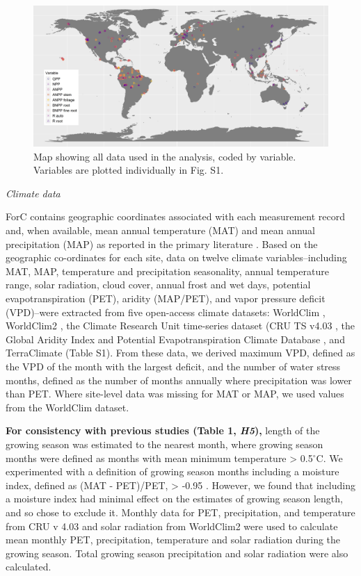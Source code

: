 \documentclass[
]{article}
\begin{document}
\begin{figure}[H]
\includegraphics[width=1\linewidth]{distribution_all_variables_cropped} \caption{Map showing all data used in the analysis, coded by variable. Variables are plotted individually in Fig. S1. }\label{fig:unnamed-chunk-6}
\end{figure}

\emph{Climate data}

ForC contains geographic coordinates associated with each measurement
record and, when available, mean annual temperature (MAT) and mean
annual precipitation (MAP) as reported in the primary literature
\citep{anderson-teixeira_forc_2018}. Based on the geographic
co-ordinates for each site, data on twelve climate variables--including
MAT, MAP, temperature and precipitation seasonality, annual temperature
range, solar radiation, cloud cover, annual frost and wet days,
potential evapotranspiration (PET), aridity (MAP/PET), and vapor
pressure deficit (VPD)--were extracted from five open-access climate
datasets: WorldClim \citep{hijmans_very_2005}, WorldClim2
\citep{fick_worldclim_2017}, the Climate Research Unit time-series
dataset (CRU TS v4.03 \citep{harris_updated_2014}, the Global Aridity
Index and Potential Evapotranspiration Climate Database
\citep{trabucco_global_2019}, and TerraClimate
\citep{abatzoglou_terraclimate_2018} (Table S1). From these data, we
derived maximum VPD, defined as the VPD of the month with the largest
deficit, and the number of water stress months, defined as the number of
months annually where precipitation was lower than PET. Where site-level
data was missing for MAT or MAP, we used values from the WorldClim
dataset.

\textbf{For consistency with previous studies (Table 1, \emph{H5}),}
length of the growing season was estimated to the nearest month, where
growing season months were defined as months with mean minimum
temperature \textgreater{} 0.5\(^\circ\)C. We experimented with a
definition of growing season months including a moisture index, defined
as (MAT - PET)/PET, \textgreater{} -0.95
\citetext{\citealp{kerkhoff_plant_2005}; \citealp[see
also][]{michaletz_convergence_2014}}. However, we found that including a
moisture index had minimal effect on the estimates of growing season
length, and so chose to exclude it. Monthly data for PET, precipitation,
and temperature from CRU v 4.03 \citep{harris_updated_2014} and solar
radiation from WorldClim2 \citep{fick_worldclim_2017} were used to
calculate mean monthly PET, precipitation, temperature and solar
radiation during the growing season. Total growing season precipitation
and solar radiation were also calculated.
\end{document}
